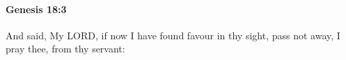 
		\paragraph{Genesis 18:3} %
			\label{GENESIS-18-3}

			And said, My LORD, if now I have found favour in thy sight, pass not away, I pray thee, from thy servant:


